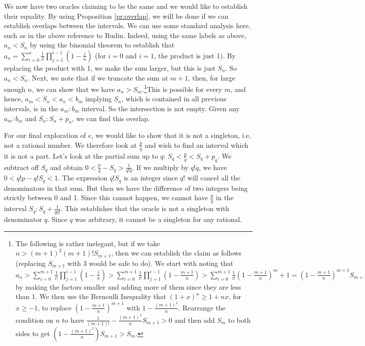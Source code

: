 \documentclass[12pt]{article}
\theoremstyle{remark}
\begin{document}
We now have two oracles claiming to be the same and we would like to establish their equality. By using Proposition \ref{pr:overlap}, we will be done if we can establish overlaps between the intervals. We can use some standard analysis here, such as in the above reference to Rudin. Indeed, using the same labels as above, $a_n < S_n$ by using the binomial theorem to establish that $a_n = \sum_{i=0}^n \frac{1}{i!} \prod_{j=1}^{i-1} (1-\tfrac{j}{n})$ (for $i=0$ and $i=1$, the product is just 1). By replacing the product with 1, we make the sum larger, but this is just $S_n$. So $a_n < S_n$.  Next, we note that if we truncate the sum at $m+1$, then, for large enough $n$, we can show that we have $a_n > S_m$.\footnote{The following is rather inelegant, but if we take $n > (m+1)^2 (m+1)! S_{m+1}$, then we can establish the claim as follows (replacing $S_{m+1}$ with 3 would be safe to do). We start with noting that $a_n > \sum_{i=0}^{m+1} \frac{1}{i!} \prod_{j=1}^{i-1} (1-\tfrac{j}{n}) > \sum_{i=0}^{m+1} \frac{1}{i!} \prod_{j=1}^{i-1} (1-\tfrac{m+1}{n}) > \sum_{i=0}^{m+1} \frac{1}{i!} (1-\tfrac{m+1}{n})^m+1 = (1-\tfrac{m+1}{n})^{m+1} S_{m+1}$ by making the factors smaller and adding more of them since they are less than 1. We then use the Bernoulli Inequality that $(1+x)^n \geq 1+ nx$, for $x \geq -1$, to replace $(1-\tfrac{m+1}{n})^{m+1}$ with $1-\tfrac{(m+1)^2}{n}$. Rearrange the condition on $n$ to have $\tfrac{1}{(m+1)!} - \tfrac{(m+1)^2}{n} S_{m+1} > 0$ and then add $S_m$ to both sides to get $(1-\tfrac{(m+1)^2}{n})S_{m+1} > S_m$.  }This is possible for every $m$, and hence, $a_m < S_n < a_n < b_m$ implying $S_n$, which is contained in all previous intervals, is in the $a_m:b_m$ interval. So the intersection is not empty. Given any $a_m:b_m$ and $S_n:S_n+p_n$, we can find this overlap. 

For our final exploration of $e$, we would like to show that it is not a singleton, i.e, not a rational number. We therefore look at $\tfrac{p}{q}$ and wish to find an interval which it is not a part.  Let's look at the partial sum up to $q$:  $S_q < \tfrac{p}{q} <  S_q + p_q$. We subtract off $S_q$ and obtain $0 < \tfrac{p}{q} - S_q > \tfrac{1}{q! q}$. If we multiply by $q! q$, we have $0 < q! p - q!S_q < 1$.  The expression $q! S_q$ is an integer since $q!$ will cancel all the denominators in that sum. But then we have the difference of two integers being strictly between 0 and 1. Since this cannot happen, we cannot have $\tfrac{p}{q}$ in the interval $S_q : S_q + \frac{1}{q q!}$. This establishes that the oracle is not a singleton with denominator $q$. Since $q$ was arbitrary, it cannot be a singleton for any rational. 
\end{document}
